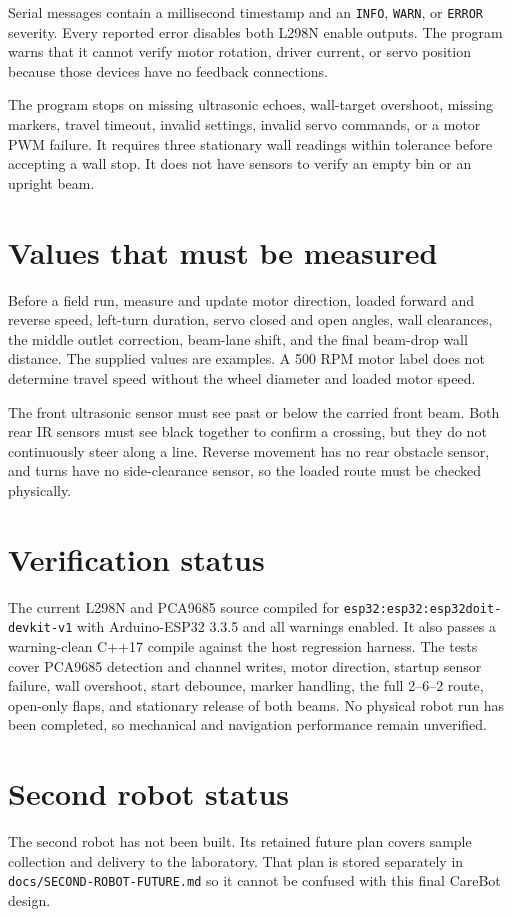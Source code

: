 \documentclass[10pt]{article}
\begin{document}
Serial messages contain a millisecond timestamp and an \texttt{INFO}, \texttt{WARN}, or \texttt{ERROR} severity. Every reported error disables both L298N enable outputs. The program warns that it cannot verify motor rotation, driver current, or servo position because those devices have no feedback connections.

The program stops on missing ultrasonic echoes, wall-target overshoot, missing markers, travel timeout, invalid settings, invalid servo commands, or a motor PWM failure. It requires three stationary wall readings within tolerance before accepting a wall stop. It does not have sensors to verify an empty bin or an upright beam.

\section*{Values that must be measured}

Before a field run, measure and update motor direction, loaded forward and reverse speed, left-turn duration, servo closed and open angles, wall clearances, the middle outlet correction, beam-lane shift, and the final beam-drop wall distance. The supplied values are examples. A 500 RPM motor label does not determine travel speed without the wheel diameter and loaded motor speed.

The front ultrasonic sensor must see past or below the carried front beam. Both rear IR sensors must see black together to confirm a crossing, but they do not continuously steer along a line. Reverse movement has no rear obstacle sensor, and turns have no side-clearance sensor, so the loaded route must be checked physically.

\section*{Verification status}

The current L298N and PCA9685 source compiled for \texttt{esp32:esp32:esp32doit-devkit-v1} with Arduino-ESP32 3.3.5 and all warnings enabled. It also passes a warning-clean C++17 compile against the host regression harness. The tests cover PCA9685 detection and channel writes, motor direction, startup sensor failure, wall overshoot, start debounce, marker handling, the full 2--6--2 route, open-only flaps, and stationary release of both beams. No physical robot run has been completed, so mechanical and navigation performance remain unverified.

\section*{Second robot status}

The second robot has not been built. Its retained future plan covers sample collection and delivery to the laboratory. That plan is stored separately in \texttt{docs/SECOND-ROBOT-FUTURE.md} so it cannot be confused with this final CareBot design.
\end{document}
